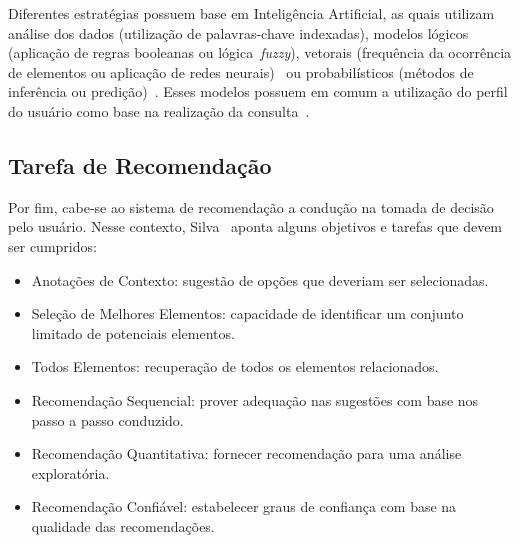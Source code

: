 \documentclass{svproc}
\begin{document}
Diferentes estratégias possuem base em Inteligência Artificial, as quais utilizam análise dos dados (utilização de palavras-chave indexadas), modelos lógicos (aplicação de regras booleanas ou lógica~\textit{fuzzy}), vetorais (frequência da ocorrência de elementos ou aplicação de redes neurais)~\cite{souza2006sistemas} ou probabilísticos (métodos de inferência ou predição)~\cite{khan2010review,silva2016}.
Esses modelos possuem em comum a utilização do perfil do usuário como base na realização da consulta~\cite{baeza1999modern,souza2006sistemas}.


\subsection{Tarefa de Recomendação}
\label{section:tarefa}
Por fim, cabe-se ao sistema de recomendação a condução na tomada de decisão pelo usuário. Nesse contexto, Silva~\cite{silva2016} aponta alguns objetivos e tarefas que devem ser cumpridos:
\begin{itemize}
    \item Anotações de Contexto: sugestão de opções que deveriam ser selecionadas.
    \item Seleção de Melhores Elementos: capacidade de identificar um conjunto limitado de potenciais elementos.
    \item Todos Elementos: recuperação de todos os elementos relacionados.
    \item Recomendação Sequencial: prover adequação nas sugestões com base nos passo a passo conduzido.
    \item Recomendação Quantitativa: fornecer recomendação para uma análise exploratória.
    \item Recomendação Confiável: estabelecer graus de confiança com base na qualidade das recomendações.
\end{itemize}
%


%
\end{document}
